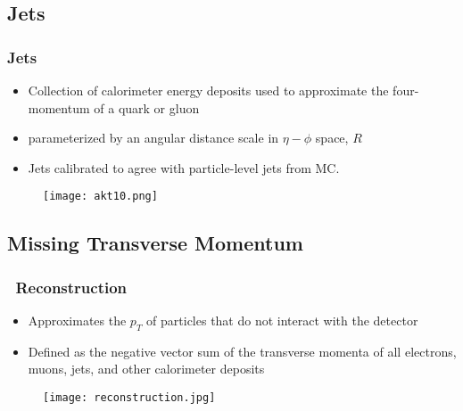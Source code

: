 \subsection{Jets}

\begin{frame}[label=jet_reco]
    \frametitle{Jets}
\begin{itemize}
    \item Collection of calorimeter energy deposits used to
        approximate the four-momentum of a quark or gluon
    \item {}
        parameterized by an angular distance scale in $\eta-\phi$
        space, $R$ \item Jets calibrated to agree with particle-level
            jets from MC\@.
\end{itemize}
\vfill
\begin{figure}
\centering
    \texttt{[image: akt10.png]}
\end{figure}
\end{frame}

\subsection{Missing Transverse Momentum}

\begin{frame}
    \frametitle{\met\ Reconstruction}
\begin{itemize}
    \item Approximates the $p_T$ of particles that do not interact
        with the detector
    \item Defined as the negative vector sum of the transverse momenta
        of all electrons, muons, jets, and other calorimeter deposits
\end{itemize}
\vfill
\begin{figure}
\centering
\texttt{[image: reconstruction.jpg]}
\end{figure}
\end{frame}

